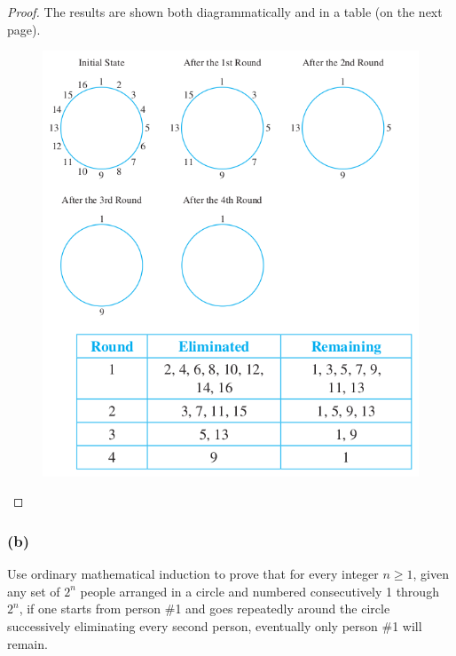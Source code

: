 \documentclass[14pt]{extarticle}
\begin{document}
\begin{proof}
The results are shown both diagrammatically and in a table (on the next page).

\begin{figure}[ht!]
\centering
\includegraphics[scale=0.4]{../images/5.4.24.a.png}
\end{figure}
\end{proof}

\subsubsection{(b)}
Use ordinary mathematical induction to prove that for every integer $n \geq 1$, given any set of $2^n$ people arranged in a circle and numbered consecutively 1 through $2^n$, if one starts from person \#1 and goes repeatedly around the circle successively eliminating every second person, eventually only person \#1 will remain.
\end{document}
